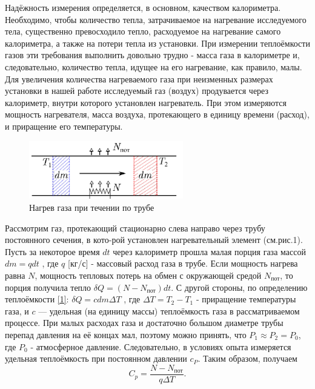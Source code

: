\documentclass[a4paper, 12pt]{article}
\begin{document}
Надёжность измерения определяется, в основном, качеством калориметра. Необходимо, чтобы количество тепла, затрачиваемое на нагревание исследуемого тела, существенно превосходило тепло, расходуемое на нагревание самого калориметра, а также на потери тепла из установки. При измерении теплоёмкости газов эти требования выполнить довольно трудно - масса газа в калориметре и, следовательно, количество тепла, идущее на его нагревание, как правило, малы. Для увеличения количества нагреваемого газа при неизменных размерах установки в нашей работе исследуемый газ (воздух) продувается через калориметр, внутри которого установлен нагреватель. При этом измеряются мощность нагревателя, масса воздуха, протекающего в единицу времени (расход), и приращение его температуры.

\begin{figure}
  \begin{center}
    \includegraphics[width = 0.6\textwidth]{1.png}
  \end{center}
  \caption{Нагрев газа при течении по трубе}
  \label{ris1}
\end{figure}

Рассмотрим газ, протекающий стационарно слева направо через трубу постоянного сечения, в кото-рой установлен нагревательный элемент (см.рис.1). Пусть за некоторое время $dt$ через калориметр прошла малая порция газа массой $dm = q dt$ , где $q$ [кг/с] - массовый расход газа в трубе. Если мощность нагрева равна $N$, мощность тепловых потерь на обмен с окружающей средой $N_{\text{пот}}$, то порция получила тепло $\delta Q =(N - N_{\text{пот}})dt$. С другой стороны, по определению теплоёмкости
\eqref{1}: $\delta Q =c dm \Delta T$ , где $\Delta T = T_2 - T_1$ - приращение температуры газа, и $c$ — удельная (на единицу массы) теплоёмкость газа в рассматриваемом процессе. При малых расходах газа и достаточно большом диаметре трубы перепад давления на её концах мал, поэтому можно принять, что $P_1 \approx P_2 = P_0$, где $P_0$ - атмосферное давление. Следовательно, в условиях опыта измеряется удельная теплоёмкость при постоянном давлении $c_P$. Таким образом, получаем
\begin{equation}\label{2}
C_p = \dfrac{N - N_{\text{пот}}}{q \Delta T}.
\end{equation}
\end{document}

